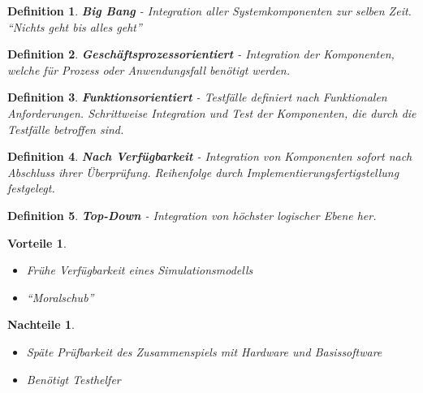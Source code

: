 \documentclass[a4paper]{article}
\theoremstyle{break}
\newtheorem{defi}{Definition}[section]
\newtheorem{why}{Vorteile}[section]
\newtheorem{whynot}{Nachteile}[section]
\begin{document}
          \begin{defi}
            \textbf{Big Bang} - Integration aller Systemkomponenten zur selben Zeit. \newline
            ``Nichts geht bis alles geht''
          \end{defi}

          \begin{defi}
            \textbf{Gesch\"aftsprozessorientiert} - Integration der Komponenten, welche für Prozess oder Anwendungsfall benötigt werden.
          \end{defi}

          \begin{defi}
            \textbf{Funktionsorientiert} - Testfälle definiert nach Funktionalen Anforderungen. Schrittweise Integration und Test der Komponenten, die durch die Testfälle betroffen sind.
          \end{defi}

          \begin{defi}
            \textbf{Nach Verfügbarkeit} - Integration von Komponenten sofort nach Abschluss ihrer Überprüfung. Reihenfolge durch Implementierungsfertigstellung festgelegt.
          \end{defi}

          \begin{defi}
            \textbf{Top-Down} - Integration von höchster logischer Ebene her.
          \end{defi}
          \begin{why}
            \begin{itemize}
            \item Frühe Verfügbarkeit eines Simulationsmodells
            \item ``Moralschub''
            \end{itemize}
          \end{why}
          \begin{whynot}
            \begin{itemize}
            \item Späte Prüfbarkeit des Zusammenspiels mit Hardware und Basissoftware
            \item Benötigt Testhelfer
            \end{itemize}
          \end{whynot}
          
\end{document}
